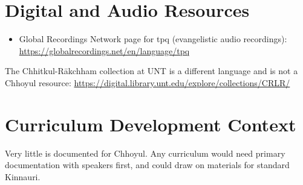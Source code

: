 \documentclass[12pt]{article}
\begin{document}
\section{Digital and Audio Resources}
\begin{itemize}
\item Global Recordings Network page for tpq (evangelistic audio recordings): \url{https://globalrecordings.net/en/language/tpq}
\end{itemize}
The Chhitkul-R\=akchham collection at UNT is a different language and is not a Chhoyul resource: \url{https://digital.library.unt.edu/explore/collections/CRLR/}

\section{Curriculum Development Context}
Very little is documented for Chhoyul. Any curriculum would need primary documentation with speakers first, and could draw on materials for standard Kinnauri.
\end{document}

